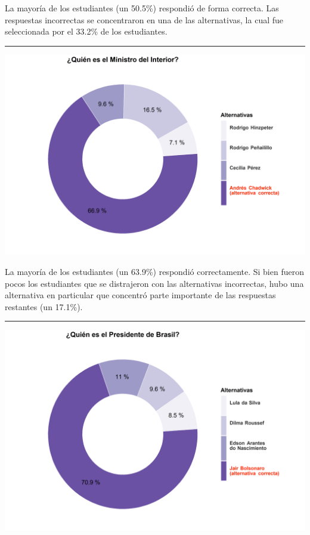 \documentclass[
  14pt,
]{book}
\let\origfigure\figure
\let\endorigfigure\endfigure
\renewenvironment{figure}[1][2] {
  \expandafter\origfigure\expandafter[H]
} {
  \endorigfigure
}
\begin{document}
La mayoría de los estudiantes (un 50.5\%) respondió de forma correcta. Las respuestas incorrectas se concentraron en una de las alternativas, la cual fue seleccionada por el 33.2\% de los estudiantes.

\begin{center}\rule{0.5\linewidth}{0.5pt}\end{center}

\begin{figure}[!ht]

{\centering \includegraphics[width=0.8\linewidth,]{images/ccivico_11} 

}

\caption{Ministro del interior}\label{fig:unnamed-chunk-15}
\end{figure}

La mayoría de los estudiantes (un 63.9\%) respondió correctamente. Si bien fueron pocos los estudiantes que se distrajeron con las alternativas incorrectas, hubo una alternativa en particular que concentró parte importante de las respuestas restantes (un 17.1\%).

\begin{center}\rule{0.5\linewidth}{0.5pt}\end{center}

\begin{figure}[!ht]

{\centering \includegraphics[width=0.8\linewidth,]{images/ccivico_12} 

}

\caption{Presidente de Brasil}\label{fig:unnamed-chunk-16}
\end{figure}
\end{document}
